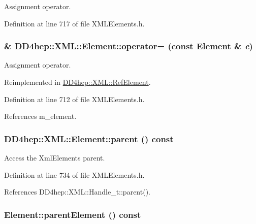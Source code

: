 Assignment operator. 

Definition at line 717 of file XMLElements.h.\hypertarget{class_d_d4hep_1_1_x_m_l_1_1_element_afa8ba01485168c3492bd913c22bc8c0d}{
\subsubsection[{operator=}]{\& DD4hep::XML::Element::operator= (const {\bf Element} \& {\em c})}}
\label{class_d_d4hep_1_1_x_m_l_1_1_element_afa8ba01485168c3492bd913c22bc8c0d}


Assignment operator. 

Reimplemented in \hyperlink{class_d_d4hep_1_1_x_m_l_1_1_ref_element_a5af29e6f73c8b0e1aa23dff6dbe8b39d}{DD4hep::XML::RefElement}.

Definition at line 712 of file XMLElements.h.

References m\_\-element.\hypertarget{class_d_d4hep_1_1_x_m_l_1_1_element_ae14a8da9743a833f4ca1947c40e5b666}{
\subsubsection[{parent}]{ DD4hep::XML::Element::parent () const}}
\label{class_d_d4hep_1_1_x_m_l_1_1_element_ae14a8da9743a833f4ca1947c40e5b666}


Access the XmlElements parent. 

Definition at line 734 of file XMLElements.h.

References DD4hep::XML::Handle\_\-t::parent().\hypertarget{class_d_d4hep_1_1_x_m_l_1_1_element_ae691ae85a47f597002426bbb00aa5957}{
\subsubsection[{parentElement}]{ Element::parentElement () const}}
\label{class_d_d4hep_1_1_x_m_l_1_1_element_ae691ae85a47f597002426bbb00aa5957}



